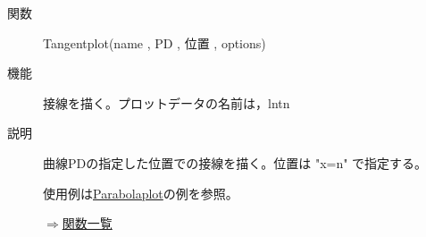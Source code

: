 \documentclass[papersize,a4paper,12pt,uplatex]{jsarticle}
\begin{document}
\begin{description}
\begin{center}

\end{center}

\vspace{\baselineskip}
\hypertarget{tangentplot}{}
\item[関数]  Tangentplot(name , PD , 位置 , options)
\item[機能]  接線を描く。プロットデータの名前は，lntn
\item[説明]  曲線PDの指定した位置での接線を描く。位置は "x=n" で指定する。

使用例は\hyperlink{parabolaplot}{Parabolaplot}の例を参照。

\begin{flushright}  \hyperlink{functionlist}{$\Rightarrow$関数一覧}\end{flushright}

\end{description}
\end{document}
